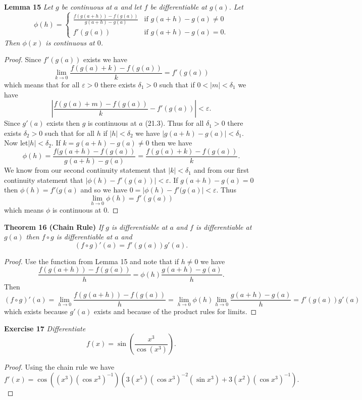 \documentclass{article}
\begin{document}
\begin{flushleft}
\textbf{Lemma 15}
\textsl{Let $g$ be continuous at $a$ and let $f$ be differentiable at $g(a)$. Let
\[
\phi (h) =
\begin{cases}
\frac{f(g(a+h)) - f(g(a))}{g(a+h)-g(a)} & \text{if $g(a+h) - g(a) \neq 0$} \\
f'(g(a)) & \text{if $g(a+h) - g(a) = 0$}.
\end{cases}
\]
Then $\phi (x)$ is continuous at $0$.}
\begin{proof}
Since $f'(g(a))$ exists we have
\[
\lim_{k \rightarrow 0} \frac{f(g(a)+k) - f(g(a))}{k} = f'(g(a))
\]
which means that for all $\varepsilon > 0$ there exists $\delta_1 > 0$ such that if $0 < |m| < \delta_1$ we have
\[
\left | \frac{f(g(a) + m) - f(g(a))}{k} - f'(g(a)) \right | < \varepsilon.
\]
Since $g'(a)$ exists then $g$ is continuous at $a$ (21.3). Thus for all $\delta_1 > 0$ there exists $\delta_2 > 0$ such that for all $h$ if $|h| < \delta_2$ we have $|g(a+h) - g(a)| < \delta_1$. Now let$|h| < \delta_2$. If $k = g(a+h) - g(a) \neq 0$ then we have
\[
\phi (h) = \frac{f(g(a+h) - f(g(a))}{g(a+h) - g(a)} = \frac{f(g(a)+k) - f(g(a))}{k}.
\]
We know from our second continuity statement that $|k| < \delta_1$ and from our first continuity statement that $|\phi(h) - f'(g(a))| < \varepsilon$. If $g(a+h) - g(a) = 0$ then $\phi(h) = f'(g(a)$ and so we have $0 = |\phi(h) - f'(g(a)| < \varepsilon$. Thus
\[
\lim_{h \rightarrow 0} \phi (h) = f'(g(a))
\]
which means $\phi$ is continuous at $0$.
\end{proof}

\textbf{Theorem 16 (Chain Rule)}
\textsl{If $g$ is differentiable at $a$ and $f$ is differentiable at $g(a)$ then $f \circ g$ is differentiable at $a$ and
\[
(f \circ g)' (a) = f'(g(a)) g'(a).
\]}
\begin{proof}
Use the function from Lemma 15 and note that if $h \neq 0$ we have
\[
\frac{f(g(a+h)) - f(g(a))}{h} = \phi(h) \frac{g(a+h) - g(a)}{h}.
\]
Then
\[
(f \circ g)' (a) = \lim_{h \rightarrow 0} \frac{f(g(a+h)) - f(g(a))}{h} = \lim_{h \rightarrow 0} \phi(h) \lim_{h \rightarrow 0} \frac{g(a+h) - g(a)}{h} = f'(g(a)) g'(a)
\]
which exists because $g'(a)$ exists and because of the product rules for limits.
\end{proof}

\textbf{Exercise 17}
\textsl{Differentiate
\[
f(x) = \sin \left ( \frac{x^3}{\cos \left (x^3 \right )} \right ).
\]}
\begin{proof}
Using the chain rule we have
\[
f'(x) = \cos \left ( (x^3)(\cos x^3)^{-1} \right ) \left ( 3(x^5)(\cos x^3)^{-2}(\sin x^3) + 3(x^2)(\cos x^3)^{-1} \right ).
\]
\end{proof}


\end{flushleft}
\end{document}
